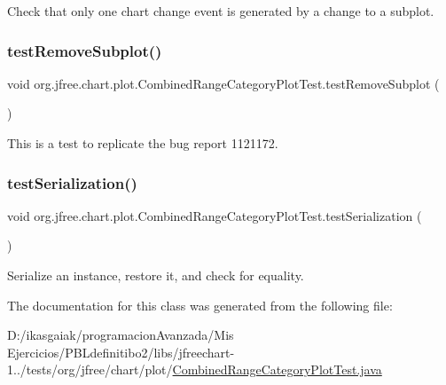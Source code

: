 Check that only one chart change event is generated by a change to a subplot. \mbox{\label{classorg_1_1jfree_1_1chart_1_1plot_1_1_combined_range_category_plot_test_ae1864cb3d41d6aadb526ee24ae211a9d}} 
\subsubsection{\texorpdfstring{test\+Remove\+Subplot()}{testRemoveSubplot()}}
{\footnotesize\ttfamily void org.\+jfree.\+chart.\+plot.\+Combined\+Range\+Category\+Plot\+Test.\+test\+Remove\+Subplot (\begin{DoxyParamCaption}{ }\end{DoxyParamCaption})}

This is a test to replicate the bug report 1121172. \mbox{\label{classorg_1_1jfree_1_1chart_1_1plot_1_1_combined_range_category_plot_test_a06ed432ff4753e62864709d391a3ec55}} 
\subsubsection{\texorpdfstring{test\+Serialization()}{testSerialization()}}
{\footnotesize\ttfamily void org.\+jfree.\+chart.\+plot.\+Combined\+Range\+Category\+Plot\+Test.\+test\+Serialization (\begin{DoxyParamCaption}{ }\end{DoxyParamCaption})}

Serialize an instance, restore it, and check for equality. 

The documentation for this class was generated from the following file\+:\begin{DoxyCompactItemize}
\item 
D\+:/ikasgaiak/programacion\+Avanzada/\+Mis Ejercicios/\+P\+B\+Ldefinitibo2/libs/jfreechart-\/1../tests/org/jfree/chart/plot/\mbox{\hyperlink{_combined_range_category_plot_test_8java}{Combined\+Range\+Category\+Plot\+Test.\+java}}\end{DoxyCompactItemize}
